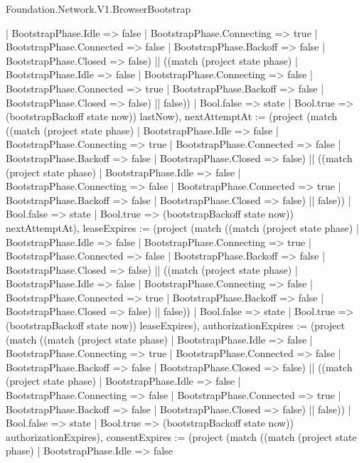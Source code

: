 \begin{lexlean}{Foundation.Network.V1.BrowserBootstrap}
\begin{semanticmodule}
{{          | BootstrapPhase.Idle => false
          | BootstrapPhase.Connecting => true
          | BootstrapPhase.Connected => false
          | BootstrapPhase.Backoff => false
          | BootstrapPhase.Closed => false) || ((match (project state phase)
          | BootstrapPhase.Idle => false
          | BootstrapPhase.Connecting => false
          | BootstrapPhase.Connected => true
          | BootstrapPhase.Backoff => false
          | BootstrapPhase.Closed => false) || false))
        | Bool.false => state
        | Bool.true => (bootstrapBackoff state now)) lastNow), nextAttemptAt := (project (match ((match (project state phase)
          | BootstrapPhase.Idle => false
          | BootstrapPhase.Connecting => true
          | BootstrapPhase.Connected => false
          | BootstrapPhase.Backoff => false
          | BootstrapPhase.Closed => false) || ((match (project state phase)
          | BootstrapPhase.Idle => false
          | BootstrapPhase.Connecting => false
          | BootstrapPhase.Connected => true
          | BootstrapPhase.Backoff => false
          | BootstrapPhase.Closed => false) || false))
        | Bool.false => state
        | Bool.true => (bootstrapBackoff state now)) nextAttemptAt), leaseExpires := (project (match ((match (project state phase)
          | BootstrapPhase.Idle => false
          | BootstrapPhase.Connecting => true
          | BootstrapPhase.Connected => false
          | BootstrapPhase.Backoff => false
          | BootstrapPhase.Closed => false) || ((match (project state phase)
          | BootstrapPhase.Idle => false
          | BootstrapPhase.Connecting => false
          | BootstrapPhase.Connected => true
          | BootstrapPhase.Backoff => false
          | BootstrapPhase.Closed => false) || false))
        | Bool.false => state
        | Bool.true => (bootstrapBackoff state now)) leaseExpires), authorizationExpires := (project (match ((match (project state phase)
          | BootstrapPhase.Idle => false
          | BootstrapPhase.Connecting => true
          | BootstrapPhase.Connected => false
          | BootstrapPhase.Backoff => false
          | BootstrapPhase.Closed => false) || ((match (project state phase)
          | BootstrapPhase.Idle => false
          | BootstrapPhase.Connecting => false
          | BootstrapPhase.Connected => true
          | BootstrapPhase.Backoff => false
          | BootstrapPhase.Closed => false) || false))
        | Bool.false => state
        | Bool.true => (bootstrapBackoff state now)) authorizationExpires), consentExpires := (project (match ((match (project state phase)
          | BootstrapPhase.Idle => false
}}
\end{semanticmodule}
\end{lexlean}
